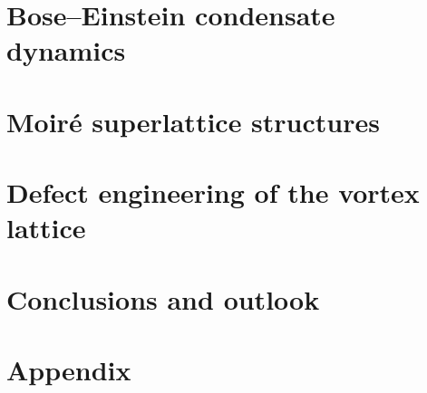 \documentclass[12pt, oneside]{book} %
\newcommand{\numberedchapter}[1]{ %
	\cleardoublepage %
    \chapter{#1}
	\lhead{\bfseries \leftmark}
}%
\begin{document}
\fi
\newif\ifvtxdyn
\vtxdyntrue
\ifvtxdyn
    \numberedchapter{Bose--Einstein condensate dynamics}\label{sec:vortlatt}
        
    \fi
\newif\ifmoire
\moiretrue
\ifmoire
    \numberedchapter{Moir\'e superlattice structures}
        
\fi
\newif\ifdefect
\defecttrue
\ifdefect
    \numberedchapter{Defect engineering of the vortex lattice}
        

\fi

\newif\ifconc
\conctrue
\ifconc
    \numberedchapter{Conclusions and outlook} %
\fi

\appendix %
\numberedchapter{Appendix}

%
%

\end{document}
